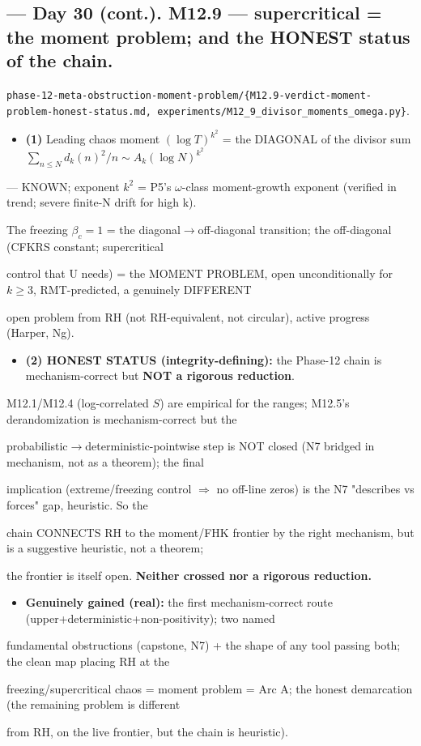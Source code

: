 \documentclass[10pt]{article}
\begin{document}
\subsection*{ --- Day 30 (cont.). M12.9 --- supercritical = the moment problem; and the HONEST status of the chain.}
\texttt{phase-12-meta-obstruction-moment-problem/\{M12.9-verdict-moment-problem-honest-status.md, experiments/M12\_9\_divisor\_moments\_omega.py\}}.\par
\begin{itemize}
\item \textbf{(1)} Leading chaos moment $(\log T)^{k^2}$ = the DIAGONAL of the divisor sum $\sum_{n\le N}d_k(n)^2/n\sim A_k(\log N)^{k^2}$
\end{itemize}
  --- KNOWN; exponent $k^2$ = P5's \ensuremath{\omega}-class moment-growth exponent (verified in trend; severe finite-N drift for high k).\par
  The freezing $\beta_c{=}1$ = the diagonal\ensuremath{\to}off-diagonal transition; the off-diagonal (CFKRS constant; supercritical\par
  control that U needs) = the MOMENT PROBLEM, open unconditionally for $k\ge3$, RMT-predicted, a genuinely DIFFERENT\par
  open problem from RH (not RH-equivalent, not circular), active progress (Harper, Ng).\par
\begin{itemize}
\item \textbf{(2) HONEST STATUS (integrity-defining):} the Phase-12 chain is mechanism-correct but \textbf{NOT a rigorous reduction}.
\end{itemize}
  M12.1/M12.4 (log-correlated $S$) are empirical for the ranges; M12.5's derandomization is mechanism-correct but the\par
  probabilistic\ensuremath{\to}deterministic-pointwise step is NOT closed (N7 bridged in mechanism, not as a theorem); the final\par
  implication (extreme/freezing control \ensuremath{\Rightarrow} no off-line zeros) is the N7 "describes vs forces" gap, heuristic. So the\par
  chain CONNECTS RH to the moment/FHK frontier by the right mechanism, but is a suggestive heuristic, not a theorem;\par
  the frontier is itself open. \textbf{Neither crossed nor a rigorous reduction.}\par
\begin{itemize}
\item \textbf{Genuinely gained (real):} the first mechanism-correct route (upper+deterministic+non-positivity); two named
\end{itemize}
  fundamental obstructions (capstone, N7) + the shape of any tool passing both; the clean map placing RH at the\par
  freezing/supercritical chaos = moment problem = Arc A; the honest demarcation (the remaining problem is different\par
  from RH, on the live frontier, but the chain is heuristic).\par
\end{document}
